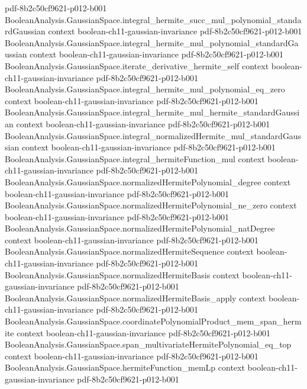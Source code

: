 \begin{lemma}
  {pdf-8b2c50cf9621-p012-b001}
\proofstep
  {BooleanAnalysis.GaussianSpace.integral_hermite_succ_mul_polynomial_standardGaussian}
  {context}
  {boolean-ch11-gaussian-invariance}
  {pdf-8b2c50cf9621-p012-b001}
\proofstep
  {BooleanAnalysis.GaussianSpace.integral_hermite_mul_polynomial_standardGaussian}
  {context}
  {boolean-ch11-gaussian-invariance}
  {pdf-8b2c50cf9621-p012-b001}
\proofstep
  {BooleanAnalysis.GaussianSpace.iterate_derivative_hermite_self}
  {context}
  {boolean-ch11-gaussian-invariance}
  {pdf-8b2c50cf9621-p012-b001}
\proofstep
  {BooleanAnalysis.GaussianSpace.integral_hermite_mul_polynomial_eq_zero}
  {context}
  {boolean-ch11-gaussian-invariance}
  {pdf-8b2c50cf9621-p012-b001}
\proofstep
  {BooleanAnalysis.GaussianSpace.integral_hermite_mul_hermite_standardGaussian}
  {context}
  {boolean-ch11-gaussian-invariance}
  {pdf-8b2c50cf9621-p012-b001}
\proofstep
  {BooleanAnalysis.GaussianSpace.integral_normalizedHermite_mul_standardGaussian}
  {context}
  {boolean-ch11-gaussian-invariance}
  {pdf-8b2c50cf9621-p012-b001}
\proofstep
  {BooleanAnalysis.GaussianSpace.integral_hermiteFunction_mul}
  {context}
  {boolean-ch11-gaussian-invariance}
  {pdf-8b2c50cf9621-p012-b001}
\proofstep
  {BooleanAnalysis.GaussianSpace.normalizedHermitePolynomial_degree}
  {context}
  {boolean-ch11-gaussian-invariance}
  {pdf-8b2c50cf9621-p012-b001}
\proofstep
  {BooleanAnalysis.GaussianSpace.normalizedHermitePolynomial_ne_zero}
  {context}
  {boolean-ch11-gaussian-invariance}
  {pdf-8b2c50cf9621-p012-b001}
\proofstep
  {BooleanAnalysis.GaussianSpace.normalizedHermitePolynomial_natDegree}
  {context}
  {boolean-ch11-gaussian-invariance}
  {pdf-8b2c50cf9621-p012-b001}
\proofstep
  {BooleanAnalysis.GaussianSpace.normalizedHermiteSequence}
  {context}
  {boolean-ch11-gaussian-invariance}
  {pdf-8b2c50cf9621-p012-b001}
\proofstep
  {BooleanAnalysis.GaussianSpace.normalizedHermiteBasis}
  {context}
  {boolean-ch11-gaussian-invariance}
  {pdf-8b2c50cf9621-p012-b001}
\proofstep
  {BooleanAnalysis.GaussianSpace.normalizedHermiteBasis_apply}
  {context}
  {boolean-ch11-gaussian-invariance}
  {pdf-8b2c50cf9621-p012-b001}
\proofstep
  {BooleanAnalysis.GaussianSpace.coordinatePolynomialProduct_mem_span_hermite}
  {context}
  {boolean-ch11-gaussian-invariance}
  {pdf-8b2c50cf9621-p012-b001}
\proofstep
  {BooleanAnalysis.GaussianSpace.span_multivariateHermitePolynomial_eq_top}
  {context}
  {boolean-ch11-gaussian-invariance}
  {pdf-8b2c50cf9621-p012-b001}
\proofstep
  {BooleanAnalysis.GaussianSpace.hermiteFunction_memLp}
  {context}
  {boolean-ch11-gaussian-invariance}
  {pdf-8b2c50cf9621-p012-b001}

\end{lemma}
